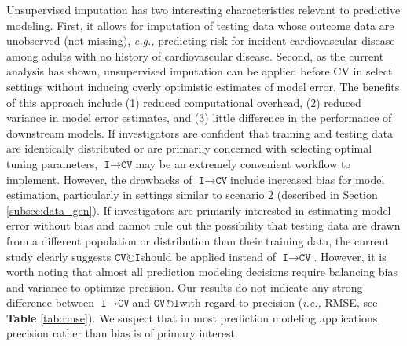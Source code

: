 \documentclass[AMA,STIX1COL,doublespace]{WileyNJD-v2}
\begin{document}
Unsupervised imputation has two interesting characteristics relevant to
predictive modeling. First, it allows for imputation of testing data
whose outcome data are unobserved (not missing),
\textit{e.g., }predicting risk for incident cardiovascular disease among
adults with no history of cardiovascular disease. Second, as the current
analysis has shown, unsupervised imputation can be applied before CV in
select settings without inducing overly optimistic estimates of model
error. The benefits of this approach include (1) reduced computational
overhead, (2) reduced variance in model error estimates, and (3) little
difference in the performance of downstream models. If investigators are
confident that training and testing data are identically distributed or
are primarily concerned with selecting optimal tuning parameters,
$\texttt{I}\!\!\rightarrow\!\texttt{CV}$\space may be an extremely
convenient workflow to implement. However, the drawbacks of
$\texttt{I}\!\!\rightarrow\!\texttt{CV}$\space include increased bias
for model estimation, particularly in settings similar to scenario 2
(described in Section \ref{subsec:data_gen}). If investigators are
primarily interested in estimating model error without bias and cannot
rule out the possibility that testing data are drawn from a different
population or distribution than their training data, the current study
clearly suggests
$\texttt{CV}\!\circlearrowright\!\texttt{I}$\space should be applied
instead of $\texttt{I}\!\!\rightarrow\!\texttt{CV}$. However, it is
worth noting that almost all prediction modeling decisions require
balancing bias and variance to optimize precision. Our results do not
indicate any strong difference between
$\texttt{I}\!\!\rightarrow\!\texttt{CV}$\space and
$\texttt{CV}\!\circlearrowright\!\texttt{I}$with regard to precision
(\textit{i.e., }RMSE, see \textbf{Table} \ref{tab:rmse}). We suspect
that in most prediction modeling applications, precision rather than
bias is of primary interest.
\end{document}
